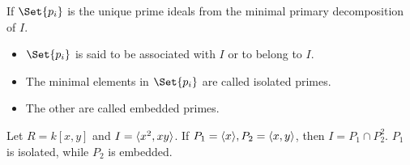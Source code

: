\begin{definition}
  If $\Set{p_i}$ is the unique prime ideals from the minimal primary decomposition of $I$.
  \begin{itemize}
    \item $\Set{p_i}$ is said to be associated with $I$ or to belong to $I$.
    \item The minimal elements in $\Set{p_i}$ are called isolated primes.
    \item The other are called embedded primes.
  \end{itemize}
\end{definition}

\begin{example}
  Let $R = k[x, y]$ and $I = \langle x^2, xy \rangle$. If $P_1 = \langle x\rangle,
  P_2 = \langle x, y \rangle$, then $I = P_1 \cap P_2^2$.
  $P_1$ is isolated, while $P_2$ is embedded.
\end{example}
